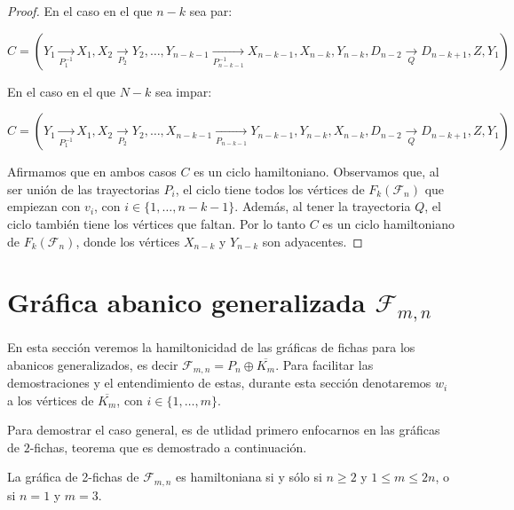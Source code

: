 \begin{proof}
    En el caso en el que $n-k$ sea par:
            
    $C =(Y_1 \xrightarrow[P_1^{-1}]{} X_1, X_2 \xrightarrow[P_2]{} Y_2, \dots,
    Y_{n-k-1} \xrightarrow[P_{n-k-1}^{-1}]{} X_{n-k-1}, X_{n-k}, Y_{n-k},
    D_{n-2} \xrightarrow[Q]{} D_{n-k+1}, Z, Y_1)$
    
    En el caso en el que $N-k$ sea impar:
    
    $C = (Y_1 \xrightarrow[P_1^{-1}]{} X_1, X_2 \xrightarrow[P_2]{} Y_2, \dots,
    X_{n-k-1} \xrightarrow[P_{n-k-1}]{} Y_{n-k-1}, Y_{n-k}, X_{n-k}, D_{n-2}
    \xrightarrow[Q]{} D_{n-k+1}, Z, Y_1)$
    
    Afirmamos que en ambos casos $C$ es un ciclo hamiltoniano. Observamos que,
    al ser uni\'on de las trayectorias $P_i$, el ciclo tiene todos los
    v\'ertices de $F_k(\mathcal{F}_n)$ que empiezan con $v_i$, con $i \in \{1,
    \dots, n-k-1\}$. Adem\'as, al tener la trayectoria $Q$, el ciclo tambi\'en
    tiene los v\'ertices que faltan. Por lo tanto $C$ es un ciclo hamiltoniano
    de $F_k(\mathcal{F}_n)$, donde los v\'ertices $X_{n-k}$ y $Y_{n-k}$ son
    adyacentes. 

\end{proof}

\section{Gr\'afica abanico generalizada
\texorpdfstring{$\mathcal{F}_{m,n}$}{Fmn}}%
\label{sec:GeneralFan}

En esta secci\'on veremos la hamiltonicidad de las gr\'aficas de fichas para los
abanicos generalizados, es decir $\mathcal{F}_{m,n}=P_n \oplus \overline{K_m}$.
Para facilitar las demostraciones y el entendimiento de estas, durante esta
secci\'on denotaremos $w_i$ a los v\'ertices de $\overline{K_m}$, con $i \in
\{1, \dots, m\}$. 

Para demostrar el caso general, es de utlidad primero enfocarnos en las
gr\'aficas de $2$-fichas, teorema que es demostrado a continuaci\'on.

\begin{teorema}
\label{teo:2-TokGenerFan}
    La gr\'afica de 2-fichas de $\mathcal{F}_{m,n}$ es hamiltoniana si y s\'olo si $n \geq
    2$ y $1 \leq m \leq 2n$, o si $n=1$ y $m=3$.
\end{teorema}

